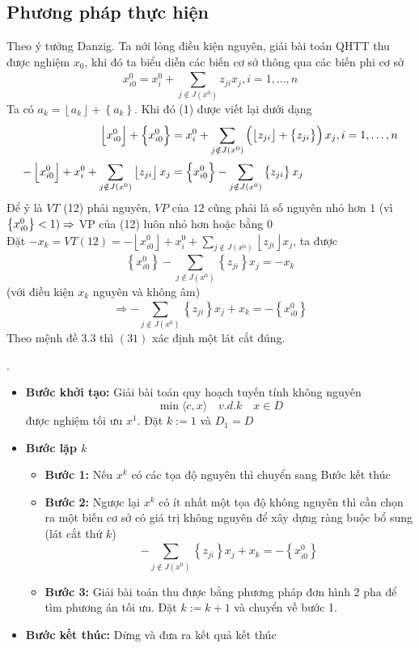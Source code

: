 \documentclass[12pt,a4paper]{article}\author{Nguyễn Nho Dũng}
\newcommand{\taphop}[1]{\left\{#1\right\}}
\newcommand{\ngoacto}[1]{\left(#1\right)}
\newcommand{\tonglanluot}[2]{\sum_{#1}^{#2}}
\newcommand{\phannguyen}[1]{\left\lfloor #1 \right\rfloor}
\begin{document}
\subsection{Phương pháp thực hiện}
Theo ý tưởng Danzig. Ta nới lỏng điều kiện nguyên, giải bài toán QHTT thu được nghiệm $x_0$, khi đó ta biểu diễn các biến cơ sở thông qua các biến phi cơ sở 
\begin{equation}
	x^0_{i0} = x^0_{i} + \tonglanluot{j \notin J(x^0)}{} z_{ji} x_j, i = 1,\ldots, n
\end{equation}
Ta có $a_k = \phannguyen{a_k} + \taphop{a_k}$. Khi đó (1) được viết lại dưới dạng
\begin{align}
	\phannguyen{x^0_{i0}} + \taphop{x^0_{i0}} &= x^0_{i} + \tonglanluot{j \notin J(x^0)}{} \ngoacto{\phannguyen{z_{ji}} + \taphop{z_{ji}}} x_j, i = 1,\ldots, n\notag\\
	-\phannguyen{x_{i0}^0} + x_i^0 + \tonglanluot{j\notin J(x^0)}{}\phannguyen{z_{ji}} x_j &= \taphop{x^0_{i0}} - \tonglanluot{j\notin J(x^0)}{}\taphop{z_{ji}} x_j
\end{align}
Để ý là $VT$ (12) phải nguyên, $VP$ của $12$ cũng phải là số nguyên nhỏ hơn $1$ (vì $\taphop{x^0_{i0}} < 1)\\
\Rightarrow $ VP của (12) luôn nhỏ hơn hoặc bằng $0$\\
Đặt $-x_k = VT(12) = -\phannguyen{x_{i0}^0} + x_i^0 + \tonglanluot{j\notin J(x^0)}{}\phannguyen{z_{ji}} x_j$, ta được $$\taphop{x_{i0}^0} - \tonglanluot{j\notin J(x^0)}{}\taphop{z_{ji}} x_j = -x_k$$
(với điều kiện $x_k$ nguyên và không âm)
\begin{equation}
	\Rightarrow -\tonglanluot{j\notin J(x^0)}{}\taphop{z_{ji}} x_j + x_k = -\taphop{x_{i0}^0}
\end{equation}
Theo mệnh đề 3.3 thì $(31)$ xác định một lát cắt đúng.

\begin{thuattoan}[Gomory].
	\begin{itemize}
		\item \textbf{Bước khởi tạo: } Giải bài toán quy hoạch tuyến tính không nguyên $$\min \langle c, x\rangle\quad v.d.k\quad x\in D$$ được nghiệm tối ưu $x^1$. Đặt $k := 1$ và $D_1 = D$
		\item \textbf{Bước lặp $k$}
		\begin{itemize}
			\item \textbf{Bước 1:} Nếu $x^k$ có các tọa độ nguyên thì chuyển sang Bước kết thúc
			\item \textbf{Bước 2:} Ngược lại $x^k$ có ít nhất một tọa độ không nguyên thì cần chọn ra một biến cơ sở có giá trị không nguyên để xây dựng ràng buộc bổ sung (lát cắt thứ $k$)
			$$-\tonglanluot{j\notin J(x^0)}{} \taphop{z_{ji}} x_j + x_k = -\taphop{x_{i0}^0}$$
			\item \textbf{Bước 3:} Giải bài toán thu được bằng phương pháp đơn hình 2 pha để tìm phương án tối ưu. Đặt $k:=k+1$ và chuyển về bước 1.
		\end{itemize}
		\item \textbf{Bước kết thúc:} Dừng và đưa ra kết quả kết thúc
	\end{itemize}
\end{thuattoan}
\end{document}
